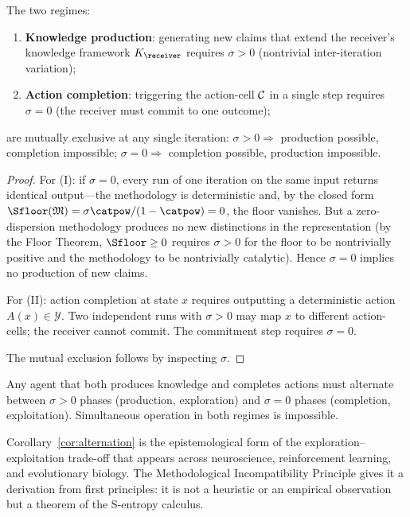 \begin{theorem}\label{thm:incompat}
The two regimes:
\begin{enumerate}[nosep, label=(\Roman*)]
  \item \textbf{Knowledge production}: generating new claims that extend the receiver's knowledge framework $K_\receiver$ requires $\sigma > 0$ (nontrivial inter-iteration variation);
  \item \textbf{Action completion}: triggering the action-cell $\mathcal{C}$ in a single step requires $\sigma = 0$ (the receiver must commit to one outcome);
\end{enumerate}
are mutually exclusive at any single iteration: $\sigma > 0 \Rightarrow$ production possible, completion impossible; $\sigma = 0 \Rightarrow$ completion possible, production impossible.
\end{theorem}

\begin{proof}
For (I): if $\sigma = 0$, every run of one iteration on the same input returns identical output---the methodology is deterministic and, by the closed form $\Sfloor(\Meth) = \sigma\catpow/(1-\catpow) = 0$, the floor vanishes. But a zero-dispersion methodology produces no new distinctions in the representation (by the Floor Theorem, $\Sfloor \geq 0$ requires $\sigma > 0$ for the floor to be nontrivially positive and the methodology to be nontrivially catalytic). Hence $\sigma = 0$ implies no production of new claims.

For (II): action completion at state $x$ requires outputting a deterministic action $A(x) \in \mathcal{Y}$. Two independent runs with $\sigma > 0$ may map $x$ to different action-cells; the receiver cannot commit. The commitment step requires $\sigma = 0$.

The mutual exclusion follows by inspecting $\sigma$.
\end{proof}

\begin{corollary}\label{cor:alternation}
Any agent that both produces knowledge and completes actions must alternate between $\sigma > 0$ phases (production, exploration) and $\sigma = 0$ phases (completion, exploitation). Simultaneous operation in both regimes is impossible.
\end{corollary}

Corollary~\ref{cor:alternation} is the epistemological form of the exploration--exploitation trade-off that appears across neuroscience, reinforcement learning, and evolutionary biology. The Methodological Incompatibility Principle gives it a derivation from first principles: it is not a heuristic or an empirical observation but a theorem of the S-entropy calculus.

